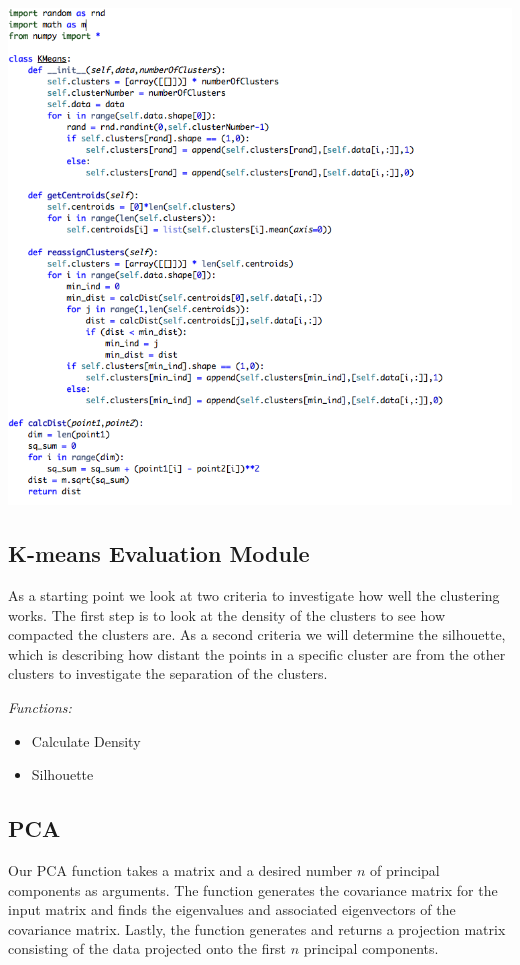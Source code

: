\documentclass[12pt]{article} %
\begin{document}
\begin{center}
\includegraphics[width=\textwidth]{claudia1.png}
\end{center}

\subsection{K-means Evaluation Module}
As a starting point we look at two criteria to investigate how well the clustering works. The first step is to look at the density of the clusters to see how compacted the clusters are. As a second criteria we will determine the silhouette, which is describing how distant the points in a specific cluster are from the other clusters to investigate the separation of the clusters.

\emph{Functions:}
	\begin{itemize}
		\item Calculate Density 
		\item Silhouette
	\end{itemize}

\subsection{PCA}

Our PCA function takes a matrix and a desired number $n$ of principal components as arguments.  The function generates the covariance matrix for the input matrix and finds the eigenvalues and associated eigenvectors of the covariance matrix.  Lastly, the function generates and returns a projection matrix consisting of the data projected onto the first $n$ principal components.
\end{document}
